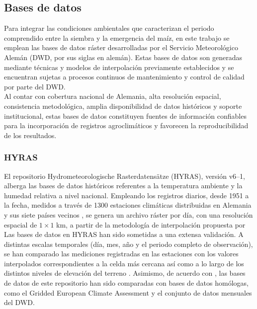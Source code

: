 \subsection{Bases de datos}
\label{subsection:Database}

Para integrar las condiciones ambientales que caracterizan el periodo comprendido entre la siembra y la emergencia del maíz, en este trabajo se emplean las bases de datos ráster desarrolladas por el Servicio Meteorológico Alemán (DWD, por sus siglas en alemán). Estas bases de datos son generadas mediante técnicas y modelos de interpolación previamente establecidos y se encuentran sujetas a procesos continuos de mantenimiento y control de calidad por parte del DWD.\\

Al contar con cobertura nacional de Alemania, alta resolución espacial, consistencia metodológica, amplia disponibilidad de datos históricos y soporte institucional, estas bases de datos constituyen fuentes de información confiables para la incorporación de registros agroclimáticos y favorecen la reproducibilidad de los resultados.\\

\subsubsection{HYRAS}

El repositorio Hydrometeorologische Rasterdatensätze (HYRAS), versión v6--1, alberga las bases de datos históricos referentes a la temperatura ambiente \citep{DWD_HYRAS_MaxTemp, DWD_HYRAS_MeanTemp, DWD_HYRAS_MinTemp} y la humedad relativa \cite{DWD_HYRAS_RelHumidity} a nivel nacional. Empleando los registros diarios, desde 1951 a la fecha, medidos a través de 1300 estaciones climáticas distribuidas en Alemania y sus siete países vecinos \citep{Razafimaharo_2020}, se genera un archivo ráster por día, con una resolución espacial de $1\times1$ km, a partir de la metodología de interpolación propuesta por \cite{Krhenmann_2016}\\



Las bases de datos en HYRAS han sido sometidas a una extensa validación. A distintas escalas temporales (día, mes, año y el periodo completo de observación), se han comparado las mediciones registradas en las estaciones con los valores interpolados correspondientes a la celda más cercana así como a lo largo de los distintos niveles de elevación del terreno \citep{Razafimaharo_2020}. Asimismo, de acuerdo con \cite{Razafimaharo_2020}, las bases de datos de este repositorio han sido comparadas con bases de datos homólogas, como el Gridded European Climate Assessment y el conjunto de datos mensuales del DWD.\\

